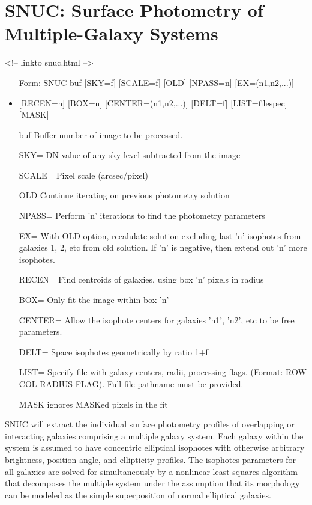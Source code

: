 \section{SNUC: Surface Photometry of Multiple-Galaxy Systems}
\begin{rawhtml}
<!-- linkto snuc.html -->
\end{rawhtml}
\begin{itemize} 
  \item[Form: SNUC buf {[SKY=f]} {[SCALE=f]} {[OLD]} {[NPASS=n]} 
       {[EX=(n1,n2,...)]}\hfill]{}
  \item{{[RECEN=n]} {[BOX=n]} {[CENTER=(n1,n2,...)]} {[DELT=f]} 
       {[LIST=filespec]} {[MASK]}}
  \item[buf]{Buffer number of image to be processed.}
  \item[SKY=]{DN value of any sky level subtracted from the image}
  \item[SCALE=]{Pixel scale (arcsec/pixel)}
  \item[OLD]{Continue iterating on previous photometry solution}
  \item[NPASS=]{Perform 'n' iterations to find the photometry parameters}
  \item[EX=]{With OLD option, recalulate solution excluding last 'n'
       isophotes from galaxies 1, 2, etc from old solution. If
       'n' is negative, then extend out 'n' more isophotes.}
  \item[RECEN=]{Find centroids of galaxies, using box 'n' pixels in radius}
  \item[BOX=]{Only fit the image within box 'n'}
  \item[CENTER=]{Allow the isophote centers for galaxies 'n1', 'n2', etc
       to be free parameters.}
  \item[DELT=]{Space isophotes geometrically by ratio 1+f}
  \item[LIST=]{Specify file with galaxy centers, radii, processing flags.
       (Format: ROW COL RADIUS FLAG). Full file pathname must be
       provided.}
  \item[MASK]{ignores MASKed pixels in the fit}
\end{itemize}

SNUC will extract the individual surface photometry profiles of overlapping
or interacting galaxies comprising a multiple galaxy system.  Each galaxy
within the system is assumed to have concentric elliptical isophotes with
otherwise arbitrary brightness, position angle, and ellipticity
profiles. The isophotes parameters for all galaxies are solved for
simultaneously by a nonlinear least-squares algorithm that decomposes the
multiple system under the assumption that its morphology can be modeled as
the simple superposition of normal elliptical galaxies.
 
